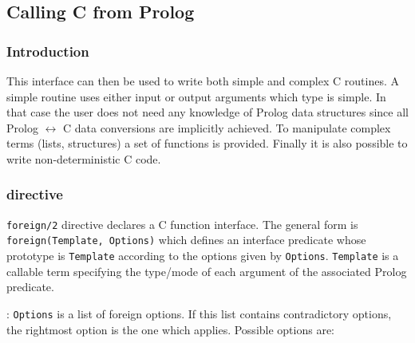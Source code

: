 \subsection{Calling C from Prolog}
\label{Calling-C-from-Prolog}

\subsubsection{Introduction}

This interface can then be used to write both simple and complex C routines.
A simple routine uses either input or output arguments which type is simple.
In that case the user does not need any knowledge of Prolog data structures
since all Prolog $\leftrightarrow$ C data conversions are implicitly
achieved. To manipulate complex terms (lists, structures) a set of functions
is provided. Finally it is also possible to write non-deterministic C code.

\subsubsection{%
 directive \label{foreign/2-directive}}

\texttt{foreign/2} directive  declares a C function interface.
The general form is \texttt{foreign(Template, Options)} which defines an
interface predicate whose prototype is \texttt{Template} according to the
options given by \texttt{Options}. \texttt{Template} is a callable term
specifying the type/mode of each argument of the associated Prolog predicate.

: \texttt{Options} is a list of foreign options. If
this list contains contradictory options, the rightmost option is the one
which applies. Possible options are:

